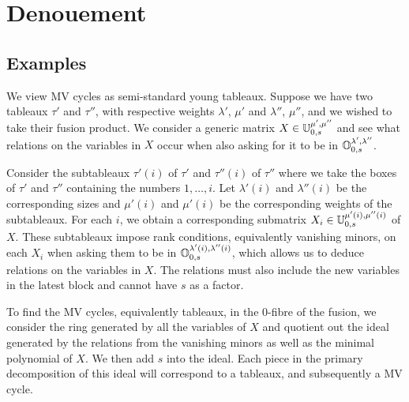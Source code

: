 \documentclass[draft]{article}
\begin{document}
% 

\section{Denouement}
\label{s:denouement}
\subsection{Examples}


We view MV cycles as semi-standard young tableaux. Suppose we have two tableaux $\tau'$ and $\tau''$, with respective weights $\lambda'$, $\mu'$ and $\lambda''$, $\mu''$, and we wished to take their fusion product. We consider a generic matrix $X \in \mathbb U^{\mu',\mu''}_{0,s}$ and see what relations on the variables in $X$ occur when also asking for it to be in $\mathbb O^{\lambda',\lambda''}_{0,s}$. 

Consider the subtableaux $\tau'(i)$ of $\tau'$ and $\tau''(i)$ of $\tau''$ where we take the boxes of $\tau'$ and $\tau''$ containing the numbers $1,\dots,i$. Let $\lambda'(i)$ and $\lambda''(i)$ be the corresponding sizes and $\mu'(i)$ and $\mu'(i)$ be the corresponding weights of the subtableaux. For each $i$, we obtain a corresponding submatrix $X_i \in \mathbb U^{\mu'(i), \mu''(i)}_{0,s}$ of $X$. These subtableaux impose rank conditions, equivalently vanishing minors, on each $X_i$ when asking them to be in $\mathbb O^{\lambda'(i), \lambda''(i)}_{0,s}$, which allows us to deduce relations on the variables in $X$. The relations must also include the new variables in the latest block and cannot have $s$ as a factor.

To find the MV cycles, equivalently tableaux, in the $0$-fibre of the fusion, we consider the ring generated by all the variables of $X$ and quotient out the ideal generated by the relations from the vanishing minors as well as the minimal polynomial of $X$. We then add $s$ into the ideal. Each piece in the primary decomposition of this ideal will correspond to a tableaux, and subsequently a MV cycle.

\end{document}
